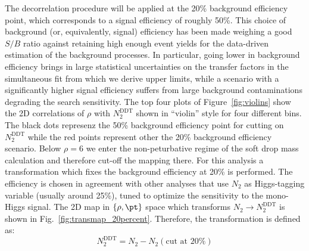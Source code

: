 The decorrelation procedure will be applied at the 20\% background efficiency point, which corresponds to a signal efficiency of roughly 50\%.
This choice of background (or, equivalently, signal) efficiency has been made weighing a good $S/B$ ratio against retaining high enough event yields for the data-driven estimation of the background processes. In particular, going lower in background efficiency brings in large statistical uncertainties on the transfer factors in the simultaneous fit from which we derive upper limits, while a scenario with a significantly higher signal efficiency suffers from large background contaminations degrading the search sensitivity.
The top four plots of Figure~\ref{fig:violins} show the 2D correlations of $\rho$ with $N_2^\text{DDT}$ shown in ``violin'' style for four different \pt bins.
The black dots represenz the 50\% background efficiency point for cutting on $N_2^\text{DDT}$ while the red points represent other
the 20\% background efficiency scenario.
Below $\rho = 6$ we enter the non-peturbative regime of the soft drop mass calculation and therefore cut-off the mapping there.
For this analysis a transformation which fixes the background efficiency at 20\% is performed. The efficiency is chosen in agreement with other analyses that use $N_2$ as Higgs-tagging variable (usually around 25\%), tuned to optimize the sensitivity to the mono-Higgs signal.  
The 2D map in $\{\rho,\pt\}$ space which transforms $N_2 \rightarrow N_2^\text{DDT}$ is shown in Fig.~\ref{fig:transmap_20percent}.
Therefore, the transformation is defined as:
\begin{equation}
N_2^\text{DDT} = N_2 - N_2(\text{cut at 20\%})
\end{equation}

